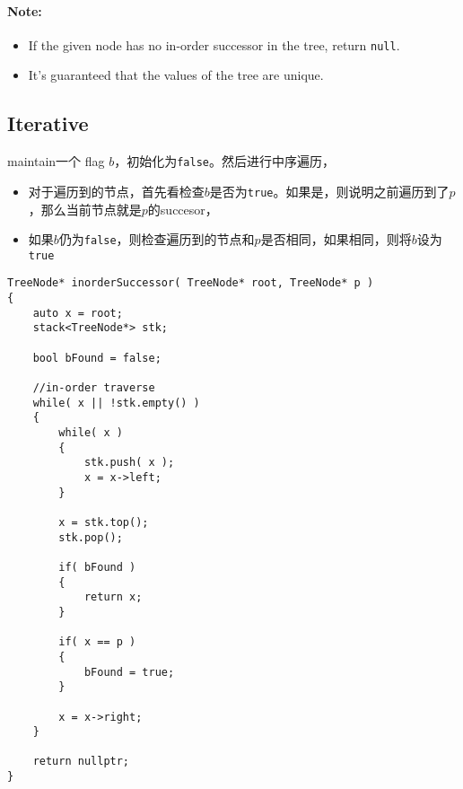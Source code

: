 \paragraph{Note:}
\begin{itemize}
    \item If the given node has no in-order successor in the tree, return \texttt{null}.
    \item It's guaranteed that the values of the tree are unique.
\end{itemize}
\subsection{Iterative}
maintain一个 flag $b$，初始化为\texttt{false}。然后进行中序遍历，
\begin{itemize}
    \item 对于遍历到的节点，首先看检查$b$是否为\texttt{true}。如果是，则说明之前遍历到了$p$，那么当前节点就是$p$的succesor，
    \item 如果$b$仍为\texttt{false}，则检查遍历到的节点和$p$是否相同，如果相同，则将$b$设为\texttt{true}
\end{itemize}
\setcounter{lstlisting}{0}
\begin{lstlisting}[style=customc, caption={Iterative In-order Traverse}]
TreeNode* inorderSuccessor( TreeNode* root, TreeNode* p )
{
    auto x = root;
    stack<TreeNode*> stk;

    bool bFound = false;

    //in-order traverse
    while( x || !stk.empty() )
    {
        while( x )
        {
            stk.push( x );
            x = x->left;
        }

        x = stk.top();
        stk.pop();

        if( bFound )
        {
            return x;
        }

        if( x == p )
        {
            bFound = true;
        }

        x = x->right;
    }

    return nullptr;
}
\end{lstlisting}
